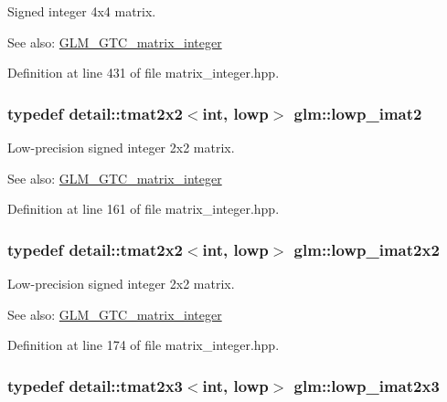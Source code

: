 Signed integer 4x4 matrix. \begin{Desc}
\item[See also:]\hyperlink{group__gtc__matrix__integer}{GLM\_\-GTC\_\-matrix\_\-integer} \end{Desc}


Definition at line 431 of file matrix\_\-integer.hpp.\hypertarget{group__gtc__matrix__integer_ge0df4bc278c1a958a32af9ac82c47630}{
\subsubsection[lowp\_\-imat2]{\setlength{\rightskip}{0pt plus 5cm}typedef detail::tmat2x2$<$int, lowp$>$ {\bf glm::lowp\_\-imat2}}}
\label{group__gtc__matrix__integer_ge0df4bc278c1a958a32af9ac82c47630}


Low-precision signed integer 2x2 matrix. \begin{Desc}
\item[See also:]\hyperlink{group__gtc__matrix__integer}{GLM\_\-GTC\_\-matrix\_\-integer} \end{Desc}


Definition at line 161 of file matrix\_\-integer.hpp.\hypertarget{group__gtc__matrix__integer_g05307630bc68a62132a82d1886a0b5e2}{
\subsubsection[lowp\_\-imat2x2]{\setlength{\rightskip}{0pt plus 5cm}typedef detail::tmat2x2$<$int, lowp$>$ {\bf glm::lowp\_\-imat2x2}}}
\label{group__gtc__matrix__integer_g05307630bc68a62132a82d1886a0b5e2}


Low-precision signed integer 2x2 matrix. \begin{Desc}
\item[See also:]\hyperlink{group__gtc__matrix__integer}{GLM\_\-GTC\_\-matrix\_\-integer} \end{Desc}


Definition at line 174 of file matrix\_\-integer.hpp.\hypertarget{group__gtc__matrix__integer_g5757953c508a6e05bf3573d6c099cf88}{
\subsubsection[lowp\_\-imat2x3]{\setlength{\rightskip}{0pt plus 5cm}typedef detail::tmat2x3$<$int, lowp$>$ {\bf glm::lowp\_\-imat2x3}}}
\label{group__gtc__matrix__integer_g5757953c508a6e05bf3573d6c099cf88}


